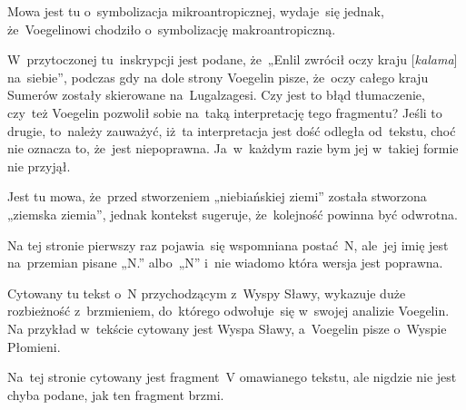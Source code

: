 \documentclass[a4paper,11pt]{article}
\numberwithin{equation}{section}
\begin{document}

\vspace{0em}



\vspace{0em}


\noindent
{} Mowa jest tu o~symbolizacja mikroantropicznej,
wydaje~się jednak, że~Voegelinowi chodziło o~symbolizację makroantropiczną.

\VerSpaceFour





\noindent
{} W~przytoczonej tu~inskrypcji jest podane, że~„Enlil
zwrócił oczy kraju [\textit{kalama}] na~siebie”, podczas gdy na dole
strony Voegelin pisze, że~oczy całego kraju Sumerów zostały skierowane
na~Lugalzagesi. Czy jest to błąd tłumaczenie, czy~też Voegelin
pozwolił sobie na~taką interpretację tego fragmentu? Jeśli to drugie,
to~należy zauważyć, iż~ta interpretacja jest dość odległa od~tekstu,
choć nie oznacza to, że~jest niepoprawna. Ja~w~każdym razie bym jej
w~takiej formie nie przyjął.

\VerSpaceFour





\noindent
{} Jest tu mowa, że~przed stworzeniem „niebiańskiej
ziemi” została stworzona „ziemska ziemia”, jednak kontekst
sugeruje, że~kolejność powinna być odwrotna.

\VerSpaceFour





\noindent
{} Na tej stronie pierwszy raz pojawia~się wspomniana
postać~N, ale~jej imię jest na~przemian pisane „N.” albo~„N” i~nie
wiadomo która wersja jest poprawna.

\VerSpaceFour





\noindent
{} Cytowany tu tekst o~N przychodzącym z~Wyspy Sławy,
wykazuje duże rozbieżność z~brzmieniem, do~którego odwołuje~się
w~swojej analizie Voegelin. Na przykład w~tekście cytowany jest Wyspa
Sławy, a~Voegelin pisze o~Wyspie Płomieni.

\VerSpaceFour





\noindent
{} Na~tej stronie cytowany jest fragment~V omawianego
tekstu, ale nigdzie nie jest chyba podane, jak ten fragment brzmi.
\end{document}

